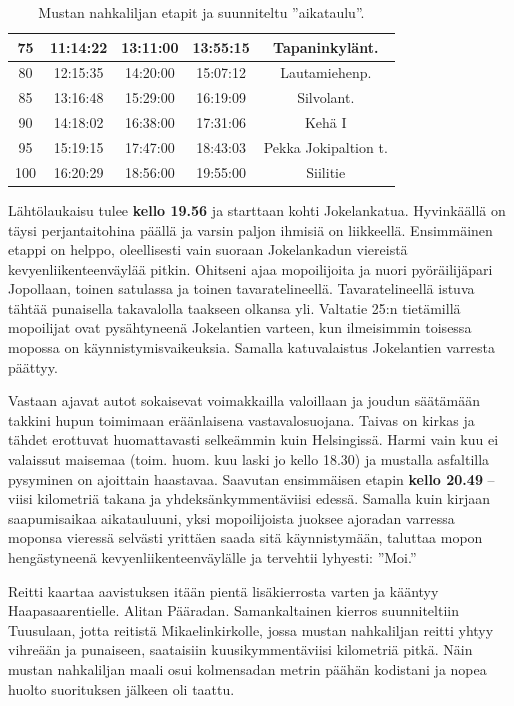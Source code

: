 \begin{multicols}{2}
\begin{table}[t]
\begin{tabular}{|c|ccc|c|}
75 & \multicolumn{1}{c|}{11:14:22} & \multicolumn{1}{c|}{13:11:00} & 13:55:15 & Tapaninkylänt. \\ \hline
80 & \multicolumn{1}{c|}{12:15:35} & \multicolumn{1}{c|}{14:20:00} & 15:07:12 & Lautamiehenp. \\ \hline
85 & \multicolumn{1}{c|}{13:16:48} & \multicolumn{1}{c|}{15:29:00} & 16:19:09 & Silvolant. \\ \hline
90 & \multicolumn{1}{c|}{14:18:02} & \multicolumn{1}{c|}{16:38:00} & 17:31:06 & Kehä I \\ \hline
95 & \multicolumn{1}{c|}{15:19:15} & \multicolumn{1}{c|}{17:47:00} & 18:43:03 & Pekka Jokipaltion t. \\ \hline
100 & \multicolumn{1}{c|}{16:20:29} & \multicolumn{1}{c|}{18:56:00} & 19:55:00 & Siilitie \\ \hline
\end{tabular}
\caption{Mustan nahkaliljan etapit ja suunniteltu ''aikataulu''.}
\end{table}

Lähtölaukaisu tulee \textbf{kello 19.56} ja starttaan kohti Jokelankatua. 
Hyvinkäällä on täysi perjantaitohina päällä ja varsin paljon ihmisiä on 
liikkeellä. Ensimmäinen etappi on helppo, oleellisesti vain suoraan 
Jokelankadun viereistä kevyenliikenteenväylää pitkin. Ohitseni ajaa 
mopoilijoita ja nuori pyöräilijäpari Jopollaan, toinen satulassa ja toinen 
tavaratelineellä. Tavaratelineellä istuva tähtää punaisella takavalolla 
taakseen olkansa yli. Valtatie 25:n tietämillä mopoilijat ovat pysähtyneenä 
Jokelantien varteen, kun ilmeisimmin toisessa mopossa on 
käynnistymisvaikeuksia. Samalla katuvalaistus Jokelantien varresta päättyy.

Vastaan ajavat autot sokaisevat voimakkailla valoillaan ja joudun 
säätämään takkini hupun toimimaan eräänlaisena vastavalosuojana. Taivas 
on kirkas ja tähdet erottuvat huomattavasti selkeämmin kuin Helsingissä. 
Harmi vain kuu ei valaissut maisemaa (toim. huom. kuu laski jo kello 18.30) ja 
mustalla asfaltilla pysyminen on ajoittain haastavaa. Saavutan ensimmäisen 
etapin \textbf{kello 20.49} -- viisi kilometriä takana ja 
yhdeksänkymmentäviisi edessä. Samalla kuin kirjaan saapumisaikaa 
aikatauluuni, yksi mopoilijoista juoksee ajoradan varressa moponsa vieressä 
selvästi yrittäen saada sitä käynnistymään, taluttaa mopon 
hengästyneenä kevyenliikenteenväylälle ja tervehtii lyhyesti: ''Moi.''

Reitti kaartaa aavistuksen itään pientä lisäkierrosta varten ja kääntyy 
Haapasaarentielle. Alitan Pääradan. Samankaltainen kierros suunniteltiin 
Tuusulaan, jotta reitistä Mikaelinkirkolle, jossa mustan nahkaliljan reitti 
yhtyy vihreään ja punaiseen, saataisiin kuusikymmentäviisi kilometriä 
pitkä. Näin mustan nahkaliljan maali osui kolmensadan metrin päähän 
kodistani ja nopea huolto suorituksen jälkeen oli taattu.


\end{multicols}
